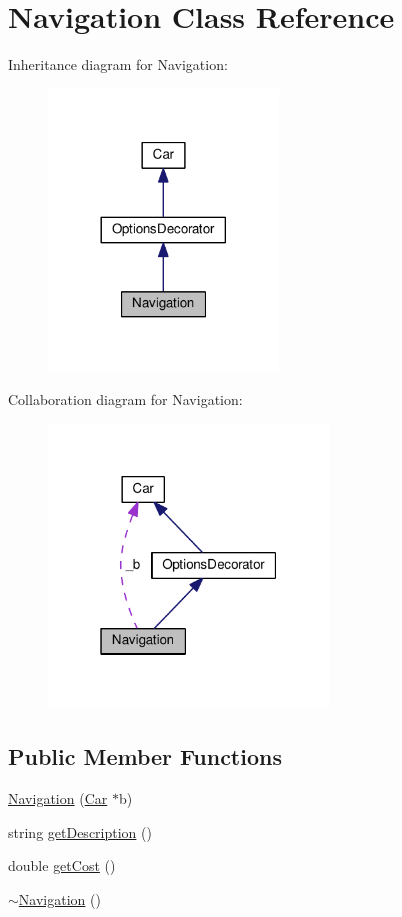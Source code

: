 \hypertarget{classNavigation}{}\section{Navigation Class Reference}
\label{classNavigation}


Inheritance diagram for Navigation\+:
\nopagebreak
\begin{figure}[H]
\begin{center}
\leavevmode
\includegraphics[width=173pt]{classNavigation__inherit__graph}
\end{center}
\end{figure}


Collaboration diagram for Navigation\+:
\nopagebreak
\begin{figure}[H]
\begin{center}
\leavevmode
\includegraphics[width=211pt]{classNavigation__coll__graph}
\end{center}
\end{figure}
\subsection*{Public Member Functions}
\begin{DoxyCompactItemize}
\item 
\hyperlink{classNavigation_a99b76cf71edd512c71d7d9b01e2df464}{Navigation} (\hyperlink{classCar}{Car} $\ast$b)
\item 
string \hyperlink{classNavigation_a2f7f7e9c43ecd76feabd46983b454e75}{get\+Description} ()
\item 
double \hyperlink{classNavigation_a2fedd3cf436e7487afc7a50d732d1054}{get\+Cost} ()
\item 
\hyperlink{classNavigation_addd4022d716df48f4e55a1db69361ba7}{$\sim$\+Navigation} ()
\end{DoxyCompactItemize}
